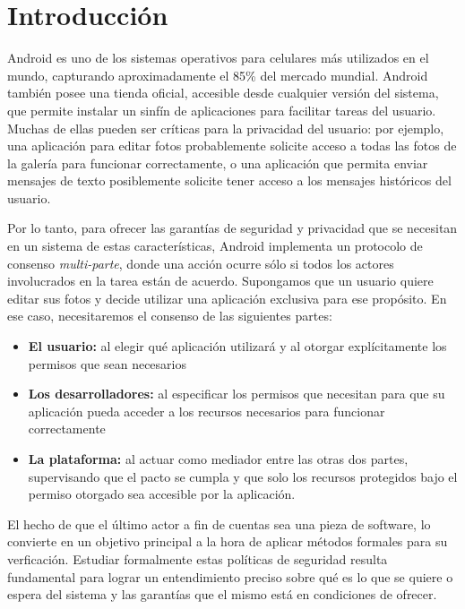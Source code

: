 \chapter{Introducción}

Android\cite{android-proyect} es uno de los sistemas operativos para celulares más utilizados en el
mundo, capturando aproximadamente el 85\% del mercado mundial\cite{idc-report}. Android también
posee una tienda oficial, accesible desde cualquier versión del sistema, que permite instalar un
sinfín de aplicaciones para facilitar tareas del usuario. Muchas de ellas pueden ser críticas para
la privacidad del usuario: por ejemplo, una aplicación para editar fotos probablemente solicite
acceso a todas las fotos de la galería para funcionar correctamente, o una aplicación que permita
enviar mensajes de texto posiblemente solicite tener acceso a los mensajes históricos del usuario.

Por lo tanto, para ofrecer las garantías de seguridad y privacidad que se necesitan en un sistema de
estas características, Android implementa un protocolo de consenso \textit{multi-parte}, donde una
acción ocurre sólo si todos los actores involucrados en la tarea están de acuerdo. Supongamos que un
usuario quiere editar sus fotos y decide utilizar una aplicación exclusiva para ese propósito. En
ese caso, necesitaremos el consenso de las siguientes partes:

\begin{itemize}
    \item \textbf{El usuario:} al elegir qué aplicación utilizará y al otorgar explícitamente los
          permisos que sean necesarios
    \item \textbf{Los desarrolladores:} al especificar los permisos que necesitan para que su
          aplicación pueda acceder a los recursos necesarios para funcionar correctamente
    \item \textbf{La plataforma:} al actuar como mediador entre las otras dos partes,
          supervisando que el pacto se cumpla y que solo los recursos protegidos bajo el permiso
          otorgado sea accesible por la aplicación.
\end{itemize}

El hecho de que el último actor a fin de cuentas sea una pieza de software, lo convierte en un
objetivo principal a la hora de aplicar métodos formales para su verficación. Estudiar formalmente
estas políticas de seguridad resulta fundamental para lograr un entendimiento preciso sobre qué es
lo que se quiere o espera del sistema y las garantías que el mismo está en condiciones de ofrecer.

